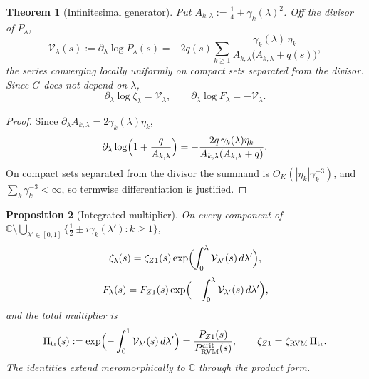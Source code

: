 \documentclass[11pt,reqno]{amsart}
\numberwithin{equation}{section}
\theoremstyle{plain}
\newtheorem{theorem}{Theorem}[section]
\newtheorem{proposition}[theorem]{Proposition}
\theoremstyle{definition}
\theoremstyle{remark}
\newcommand{\C}{\mathbb C}
\newcommand{\RVM}{\mathrm{RVM}}
\newcommand{\crit}{\mathrm{crit}}
\begin{document}
\begin{theorem}[Infinitesimal generator]\label{thm:generator}
Put $A_{k,\lambda}:=\tfrac14+\gamma_k(\lambda)^2$.  Off the divisor of $P_\lambda$,
\begin{equation}\label{eq:generator}
 \mathcal V_\lambda(s):=\partial_\lambda\log P_\lambda(s)=-2q(s)\sum_{k\ge1}\frac{\gamma_k(\lambda)\,\eta_k}{A_{k,\lambda}\bigl(A_{k,\lambda}+q(s)\bigr)},
\end{equation}
the series converging locally uniformly on compact sets separated from the divisor.  Since $G$ does not depend on $\lambda$,
\begin{equation}\label{eq:generator-zeta}
 \partial_\lambda\log\zeta_\lambda=\mathcal V_\lambda,\qquad \partial_\lambda\log F_\lambda=-\mathcal V_\lambda .
\end{equation}
\end{theorem}

\begin{proof}
Since $\partial_\lambda A_{k,\lambda}=2\gamma_k(\lambda)\eta_k$,
\begin{equation}\label{eq:mode-derivative}
 \partial_\lambda\log\Bigl(1+\frac q{A_{k,\lambda}}\Bigr)=-\frac{2q\,\gamma_k(\lambda)\eta_k}{A_{k,\lambda}(A_{k,\lambda}+q)} .
\end{equation}
On compact sets separated from the divisor the summand is $O_K(|\eta_k|\gamma_k^{-3})$, and $\sum_k\gamma_k^{-3}<\infty$, so termwise differentiation is justified.
\end{proof}

\begin{proposition}[Integrated multiplier]\label{prop:integrated-multiplier}
On every component of $\C\setminus\bigcup_{\lambda'\in[0,1]}\{\tfrac12\pm i\gamma_k(\lambda'):k\ge1\}$,
\begin{equation}\label{eq:integrated-zeta}
 \zeta_\lambda(s)=\zeta_{Z1}(s)\exp\Bigl(\int_0^\lambda\mathcal V_{\lambda'}(s)\,d\lambda'\Bigr),
\end{equation}
\begin{equation}\label{eq:integrated-inverse}
 F_\lambda(s)=F_{Z1}(s)\exp\Bigl(-\int_0^\lambda\mathcal V_{\lambda'}(s)\,d\lambda'\Bigr),
\end{equation}
and the total multiplier is
\begin{equation}\label{eq:transport-multiplier}
 \Pi_{\rm tr}(s):=\exp\Bigl(-\int_0^1\mathcal V_{\lambda'}(s)\,d\lambda'\Bigr)=\frac{P_{Z1}(s)}{P_{\RVM}^{\crit}(s)},\qquad \zeta_{Z1}=\zeta_{\RVM}\,\Pi_{\rm tr} .
\end{equation}
The identities extend meromorphically to $\C$ through the product form.
\end{proposition}
\end{document}
